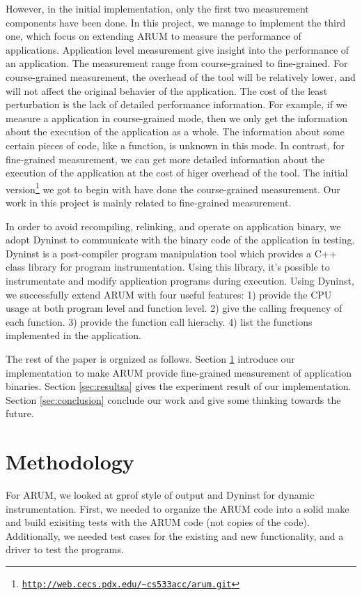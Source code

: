 \documentclass[11pt,letterpaper,oneside]{article}
\begin{document}
However, in the initial implementation, only the first two measurement components have been done. In this project, we manage to implement the third one, which focus on extending ARUM to measure the performance of applications. Application level measurement give insight into the performance of an application. The measurement range from course-grained to fine-grained. For course-grained measurement, the overhead of the tool will be relatively lower, and will not affect the original behavier of the application. The cost of the least perturbation is the lack of detailed performance information. For example, if we measure a application in course-grained mode, then we only get the information about the execution of the application as a whole. The information about some certain pieces of code, like a function, is unknown in this mode. In contrast, for fine-grained measurement, we can get more detailed information about the execution of the application at the cost of higer overhead of the tool. The initial version\footnote{\texttt{\url{http://web.cecs.pdx.edu/~cs533acc/arum.git}}} we got to begin with have done the course-grained measurement. Our work in this project is mainly related to fine-grained measurement.

In order to avoid recompiling, relinking, and operate on application binary, we adopt Dyninst \cite{bib:dyninstweb} to communicate with the binary code of the application in testing. Dyninst is \cite{bib:anapi} a post-compiler program manipulation tool which provides a C++ class library for program instrumentation. Using this library, it's possible to instrumentate and modify application programs during execution. Using Dyninst, we successfully extend ARUM with four useful features: 1) provide the CPU usage at both program level and function level. 2) give the calling frequency of each function. 3) provide the function call hierachy. 4) list the functions implemented in the application.

The rest of the paper is orgnized as follows. Section \ref{sec:methodology} introduce our implementation to make ARUM provide fine-grained measurement of application binaries. Section \ref{sec:resultsa} gives the experiment result of our implementation. Section \ref{sec:conclusion} conclude our work and give some thinking towards the future.

\section{Methodology}
\label{sec:methodology}
For ARUM, we looked at gprof style of output and Dyninst for dynamic instrumentation.  First, we needed to organize the ARUM code into a solid make and build exisiting tests with the ARUM code (not copies of the code). Additionally, we needed test cases for the existing and new functionality, and a driver to test the programs.
\end{document}
